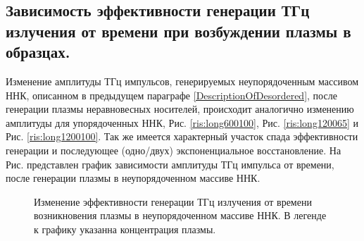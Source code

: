 \documentclass[a4paper,14pt,russian]{extreport}
\begin{document}
			\subsection{Зависимость эффективности генерации ТГц излучения от времени при возбуждении плазмы в образцах.}
				Изменение амплитуды ТГц импульсов, генерируемых неупорядоченным массивом ННК, описанном в предыдущем параграфе \ref{DescriptionOfDesordered}, после генерации плазмы неравновесных носителей, происходит аналогично изменению амплитуды для упорядоченных ННК, Рис. \ref{ris:long600100}, Рис. \ref{ris:long120065} и Рис. \ref{ris:long1200100}. Так же имеется характерный участок спада эффективности генерации и последующее (одно/двух) экспоненциальное восстановление. На Рис. представлен график зависимости амплитуды ТГц импульса от времени, после генерации плазмы в неупорядоченном массиве ННК.\par
				\begin{figure}[h]
					\caption{Изменение эффективности генерации ТГц излучения от времени возникновения плазмы в неупорядоченном массиве ННК. В легенде к графику указанна концентрация плазмы.}
				\label{ris:LongDesordered}
				\end{figure}
\end{document}
